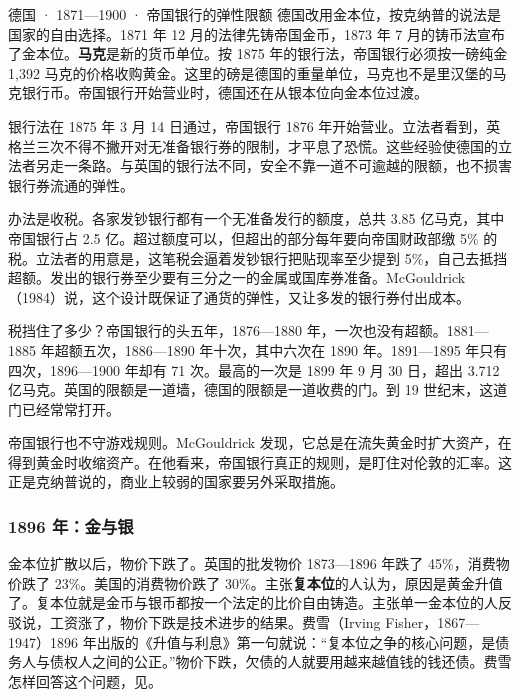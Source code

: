 \begin{case}{德国 · 1871—1900 · 帝国银行的弹性限额}
德国改用金本位，按克纳普的说法是国家的自由选择\cite{knapp1924}。1871 年 12 月的法律先铸帝国金币，1873 年 7 月的铸币法宣布了金本位\cite{reichsbank1910}。\textbf{马克}是新的货币单位。按 1875 年的银行法，帝国银行必须按一磅纯金 1,392 马克的价格收购黄金\cite{reichsbank1910}。这里的磅是德国的重量单位，马克也不是里汉堡的马克银行币。帝国银行开始营业时，德国还在从银本位向金本位过渡\cite{reichsbank1910}。

银行法在 1875 年 3 月 14 日通过，帝国银行 1876 年开始营业\cite{reichsbank1910,mcgouldrick1984}。立法者看到，英格兰三次不得不撇开对无准备银行券的限制，才平息了恐慌\cite{reichsbank1910}。这些经验使德国的立法者另走一条路\cite{reichsbank1910}。与英国的银行法不同，安全不靠一道不可逾越的限额，也不损害银行券流通的弹性\cite{reichsbank1910}。

办法是收税。各家发钞银行都有一个无准备发行的额度，总共 3.85 亿马克，其中帝国银行占 2.5 亿\cite{reichsbank1910}。超过额度可以，但超出的部分每年要向帝国财政部缴 5\% 的税\cite{reichsbank1910}。立法者的用意是，这笔税会逼着发钞银行把贴现率至少提到 5\%，自己去抵挡超额\cite{reichsbank1910}。发出的银行券至少要有三分之一的金属或国库券准备\cite{reichsbank1910,mcgouldrick1984}。McGouldrick（1984）说，这个设计既保证了通货的弹性，又让多发的银行券付出成本\cite{mcgouldrick1984}。

税挡住了多少？帝国银行的头五年，1876—1880 年，一次也没有超额\cite{reichsbank1910}。1881—1885 年超额五次，1886—1890 年十次，其中六次在 1890 年\cite{reichsbank1910}。1891—1895 年只有四次，1896—1900 年却有 71 次\cite{reichsbank1910}。最高的一次是 1899 年 9 月 30 日，超出 3.712 亿马克\cite{reichsbank1910}。英国的限额是一道墙，德国的限额是一道收费的门。到 19 世纪末，这道门已经常常打开。

帝国银行也不守游戏规则。McGouldrick 发现，它总是在流失黄金时扩大资产，在得到黄金时收缩资产\cite{mcgouldrick1984}。在他看来，帝国银行真正的规则，是盯住对伦敦的汇率\cite{mcgouldrick1984}。这正是克纳普说的，商业上较弱的国家要另外采取措施。
\end{case}

\subsubsection{1896 年：金与银}
金本位扩散以后，物价下跌了。英国的批发物价 1873—1896 年跌了 45\%，消费物价跌了 23\%\cite{boe2017}。美国的消费物价跌了 30\%\cite{boe2017}。主张\textbf{复本位}的人认为，原因是黄金升值了。复本位就是金币与银币都按一个法定的比价自由铸造。主张单一金本位的人反驳说，工资涨了，物价下跌是技术进步的结果\cite{fisher1896}。费雪（Irving Fisher，1867—1947）1896 年出版的《升值与利息》第一句就说：“复本位之争的核心问题，是债务人与债权人之间的公正。”\cite{fisher1896}物价下跌，欠债的人就要用越来越值钱的钱还债。费雪怎样回答这个问题，见。

